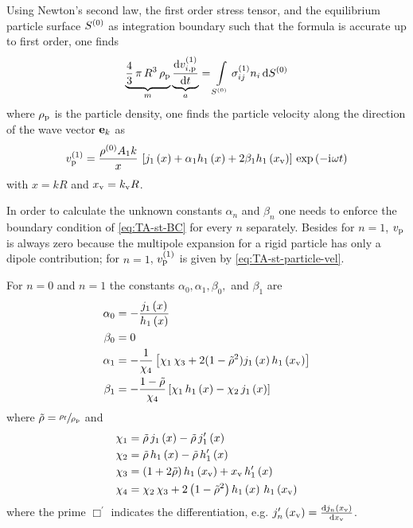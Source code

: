 Using Newton's second law, the first order stress tensor, and the equilibrium 
particle surface $S^{(0)}$ as integration boundary such that the formula is 
accurate up to first order, one finds
\begin{equation}
  \underbrace{\frac{4}{3}\,\pi\,R^{3}\,\rho_{\mathrm{p}}}_{m}
  \underbrace{\dv{  v_{i,\mathrm{p}}^{(1)}  }{t}}_{a} = 
  \int\limits_{S^{(0)}}\sigma_{ij}^{(1)}n_{i}\dd{  S^{(0)}  }
  \label{eq:TA-st-newton}
\end{equation}
where $\rho_{\mathrm{p}}$ is the particle density, one finds the particle 
velocity along the direction of the wave vector $\vb{e}_{k}$ as
\begin{equation}
  v_{\mathrm{p}}^{(1)} = \frac{\rho^{(0)}A_{1}k}{x}\,
  \left[
    j_{1}\left(x\right) + \alpha_{1}h_{1}\left(x\right) + 2\beta_{1}h_{1}\left(x_{\mathrm{v}}\right)
  \right]
  \,\exp\left( -\mathrm{i}\mkern1mu\omega t \right)
  \label{eq:TA-st-particle-vel}
\end{equation}
with $x=kR$ and $x_{\mathrm{v}}=k_{\mathrm{v}}R$.

In order to calculate the unknown constants $\alpha_{n}$ and $\beta_{n}$ one 
needs to enforce the boundary condition of \cref{eq:TA-st-BC} for every $n$ 
separately. Besides for $n=1$, $v_{\mathrm{p}}$ is always zero because the 
multipole expansion for a rigid particle has only a dipole contribution; for 
$n=1$, $v_{\mathrm{p}}^{(1)}$ is given by \cref{eq:TA-st-particle-vel}.

For $n=0$ and $n=1$ the constants $\alpha_{0}, \alpha_{1}, \beta_{0},$ and 
$\beta_{1}$ are
\begin{subequations}
\begin{align}
  \alpha_{0} & = -\frac{j_{1}\left(x\right)}{h_{1}\left(x\right)} \\
  \beta_{0} & = 0 \\
  \alpha_{1} & = - \frac{1}{\chi_{4}} \left[ \chi_{1}\,\chi_{3} + 
  2(1-\tilde{\rho}^{2})j_{1}\left(x\right)h_{1}\left(x_{\mathrm{v}}\right) \right]
    \label{eq:TA-alpha-one}\\
    \beta_{1} &= - \frac{1-\tilde{\rho}}{\chi_{4}} \left[ \chi_{1}\,h_{1}\left(x\right) - 
    \chi_{2}\,j_{1}\left(x\right) \right]
    \label{eq:TA-beta-one}
\end{align}
\end{subequations}
where $\tilde{\rho} = \sfrac{\rho_{\mathrm{f}}}{\rho_{\mathrm{p}}}$ and
\begin{subequations}
\begin{align}
\chi_{1} & = \tilde{\rho}\,j_{1}\left(x\right) - \tilde{\rho}\,j^{\prime}_{1}\left(x\right)
\label{eq:TA-chi-one} \\
\chi_{2} & = \tilde{\rho}\,h_{1}\left(x\right) - \tilde{\rho}\,h^{\prime}_{1}\left(x\right)
\label{eq:TA-chi-two} \\
\chi_{3} & = \left( 1 + 2 \tilde{\rho}\right)h_{1}\left(x_{\mathrm{v}}\right) + 
x_{\mathrm{v}}\,h^{\prime}_{1}\left(x\right)
\label{eq:TA-chi-three} \\
\chi_{4} & = \chi_{2}\,\chi_{3} + 2\left( 1 - \tilde{\rho}^{2} \right) 
h_{1}\left(x\right)\,h_{1}\left(x_{\mathrm{v}}\right)
\label{eq:TA-chi-four}
\end{align}
\end{subequations}
where the prime $\Box^{\prime}$ indicates the differentiation, e.g. 
$j^{\prime}_{n}\left(x_{\mathrm{v}}\right)=\dv{j_{n}\left(x_{\mathrm{v}}\right)}{x_{\mathrm{v}}}$.

